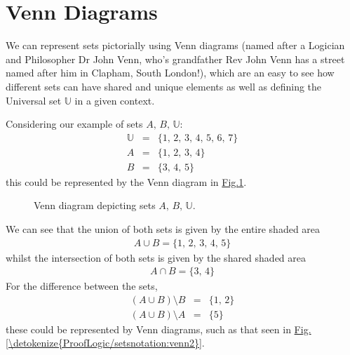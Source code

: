 \documentclass[letterpaper,10pt,english]{jupyterBook}
\begin{document}
\section{Venn Diagrams}
\label{\detokenize{ProofLogic/setsnotation:venn-diagrams}}
\sphinxAtStartPar
We can represent sets pictorially using Venn diagrams (named after a Logician and Philosopher Dr John Venn, who’s grandfather Rev John Venn has a street named
after him in Clapham, South London!), which are an easy to see how different sets can have shared and unique elements as well as defining the Universal set \(\mathbb{U}\) in a given context.

\sphinxAtStartPar
Considering our example of sets \(A,\,B,\,\mathbb{U}\):
\begin{equation*}
\begin{split}\mathbb{U} &=& \{ 1,\,2,\,3,\,4,\,5,\,6,\,7\}\\
A &=& \{1,\,2,\,3,\,4\}\\
B &=& \{3,\,4,\,5\}\end{split}
\end{equation*}
\sphinxAtStartPar
this could be represented by the Venn diagram in \hyperref[\detokenize{ProofLogic/setsnotation:venn1}]{Fig.\@ \ref{\detokenize{ProofLogic/setsnotation:venn1}}}.

\begin{figure}[htbp]
\centering
\capstart

\noindent{}
\caption{Venn diagram depicting sets \(A,\,B,\,\mathbb{U}\).}\label{\detokenize{ProofLogic/setsnotation:venn1}}\end{figure}

\sphinxAtStartPar
We can see that the union of both sets is given by the entire shaded area
\begin{equation*}
\begin{split}A \cup B = \{1,\,2,\,3,\,4,\,5\}\end{split}
\end{equation*}
\sphinxAtStartPar
whilst the intersection of both sets is given by the shared shaded area
\begin{equation*}
\begin{split}A \cap B = \{ 3,\,4\}\end{split}
\end{equation*}
\sphinxAtStartPar
For the difference between the sets,
\begin{equation*}
\begin{split}(A\cup B) \setminus B &=& \{ 1,\,2\} \\
(A\cup B) \setminus A &=& \{ 5\} \end{split}
\end{equation*}
\sphinxAtStartPar
these could be represented by Venn diagrams, such as that seen in \hyperref[\detokenize{ProofLogic/setsnotation:venn2}]{Fig.\@ \ref{\detokenize{ProofLogic/setsnotation:venn2}}}.
\end{document}
